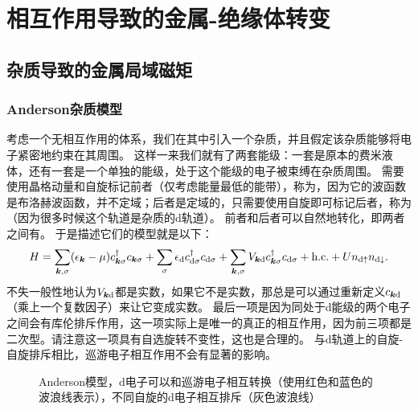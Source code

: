 \chapter{相互作用导致的金属-绝缘体转变}\label{chap:interaction-transition}

\section{杂质导致的金属局域磁矩}

\subsection{Anderson杂质模型}\label{sec:anderson-model}

考虑一个无相互作用的体系，我们在其中引入一个杂质，并且假定该杂质能够将电子紧密地约束在其周围。
这样一来我们就有了两套能级：一套是原本的费米液体，还有一套是一个单独的能级，处于这个能级的电子被束缚在杂质周围。
需要使用晶格动量和自旋标记前者（仅考虑能量最低的能带），称为，因为它的波函数是布洛赫波函数，并不定域；后者是定域的，只需要使用自旋即可标记后者，称为（因为很多时候这个轨道是杂质的d轨道）。
前者和后者可以自然地转化，即两者之间有。
于是描述它们的模型就是以下：
\begin{equation}
    {H} = \sum_{\vb*{k}, \sigma} (\epsilon_{\vb*{k}} - \mu) {c}_{\vb*{k}\sigma}^\dagger {c}_{\vb*{k} \sigma} + \sum_\sigma \epsilon_\text{d} {c}_{\text{d}\sigma}^\dagger {c}_{\text{d} \sigma} + \sum_{\vb*{k}, \sigma} V_{\vb*{k} \text{d}} {c}_{\vb*{k} \sigma}^\dagger {c}_{\text{d} \sigma} + \text{h.c.} + U {n}_{\text{d} \uparrow} {n}_{\text{d} \downarrow}.
    \label{eq:impurity-anderson}
\end{equation}
不失一般性地认为$V_{\vb*{k} \text{d}}$都是实数，如果它不是实数，那总是可以通过重新定义${c}_{\vb*{k} \text{d}}$（乘上一个复数因子）来让它变成实数。
最后一项是因为同处于d能级的两个电子之间会有库伦排斥作用，这一项实际上是唯一的真正的相互作用，因为前三项都是二次型。请注意这一项具有自选旋转不变性，这也是合理的。
与d轨道上的自旋-自旋排斥相比，巡游电子相互作用不会有显著的影响。

\begin{figure}
    \centering

    

    \caption{Anderson模型，d电子可以和巡游电子相互转换（使用红色和蓝色的波浪线表示），不同自旋的d电子相互排斥（灰色波浪线）}
    \label{fig:anderson-model}
\end{figure}

